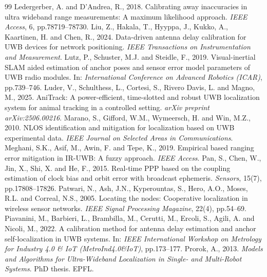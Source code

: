 \documentclass[11pt,a4paper]{article}
\begin{document}
\begin{thebibliography}{99}
 Ledergerber, A. and D'Andrea, R., 2018. Calibrating away inaccuracies in ultra wideband range measurements: A maximum likelihood approach. \emph{IEEE Access}, 6, pp.78719--78730.
 Liu, Z., Hakala, T., Hyyppa, J., Kukko, A., Kaartinen, H. and Chen, R., 2024. Data-driven antenna delay calibration for UWB devices for network positioning. \emph{IEEE Transactions on Instrumentation and Measurement}.
 Lutz, P., Schuster, M.J. and Steidle, F., 2019. Visual-inertial SLAM aided estimation of anchor poses and sensor error model parameters of UWB radio modules. In: \emph{International Conference on Advanced Robotics (ICAR)}, pp.739--746.
 Luder, V., Schulthess, L., Cortesi, S., Rivero Davis, L. and Magno, M., 2025. AniTrack: A power-efficient, time-slotted and robust UWB localization system for animal tracking in a controlled setting. \emph{arXiv preprint arXiv:2506.00216}.
 Marano, S., Gifford, W.M., Wymeersch, H. and Win, M.Z., 2010. NLOS identification and mitigation for localization based on UWB experimental data. \emph{IEEE Journal on Selected Areas in Communications}.
 Meghani, S.K., Asif, M., Awin, F. and Tepe, K., 2019. Empirical based ranging error mitigation in IR-UWB: A fuzzy approach. \emph{IEEE Access}.
 Pan, S., Chen, W., Jin, X., Shi, X. and He, F., 2015. Real-time PPP based on the coupling estimation of clock bias and orbit error with broadcast ephemeris. \emph{Sensors}, 15(7), pp.17808--17826.
 Patwari, N., Ash, J.N., Kyperountas, S., Hero, A.O., Moses, R.L. and Correal, N.S., 2005. Locating the nodes: Cooperative localization in wireless sensor networks. \emph{IEEE Signal Processing Magazine}, 22(4), pp.54--69.
 Piavanini, M., Barbieri, L., Brambilla, M., Cerutti, M., Ercoli, S., Agili, A. and Nicoli, M., 2022. A calibration method for antenna delay estimation and anchor self-localization in UWB systems. In: \emph{IEEE International Workshop on Metrology for Industry 4.0 \& IoT (MetroInd4.0\&IoT)}, pp.173--177.
 Prorok, A., 2013. \emph{Models and Algorithms for Ultra-Wideband Localization in Single- and Multi-Robot Systems}. PhD thesis. EPFL.

\end{thebibliography}
\end{document}
